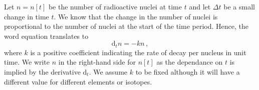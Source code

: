 \documentclass[10pt]{article}
\providecommand*{\Diff}{\Delta}              %
\providecommand*{\vat}[1]{\!\left[#1\right]} %
\providecommand*{\kdecay}{k}      %
\providecommand*{\npart}{n}       %
\providecommand*{\dt}{\text{d}_t} %
\begin{document}
Let $\npart = \npart\vat t$ be the number of radioactive nuclei at time $t$ and let $\Diff t$ be a small change in time $t$. We know that the change in the number of nuclei is proportional to the number of nuclei at the start of the time period. Hence, the word equation translates to
%
\begin{equation}
  \dt\npart = -\kdecay\npart\,,
\end{equation}
%
where $\kdecay$ is a positive coefficient indicating the rate of decay per nucleus in unit time. We write $\npart$ in the right-hand side for $\npart\vat t$ as the dependance on $t$ is implied by the derivative $\dt$. We assume $\kdecay$ to be fixed although it will have a different value for different elements or isotopes.
\end{document}
